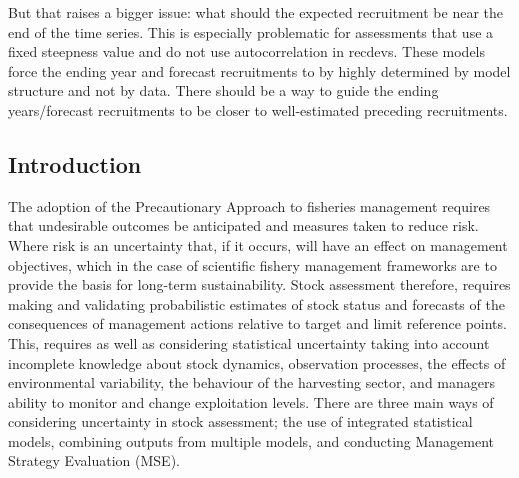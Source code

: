 \documentclass[a4paper]{article}
\begin{document}
But that raises a bigger issue: what should the expected recruitment be near the end of the time series. This is especially problematic for assessments that use a fixed steepness value and do not use autocorrelation in recdevs.  These models force the ending year and forecast recruitments to by highly determined by model structure and not by data.  There should be a way to guide the ending years/forecast recruitments to be closer to well-estimated preceding recruitments.



\begin{abstract}


\end{abstract}

\newpage
\subsection*{Introduction}

The adoption of the Precautionary Approach to fisheries management \citep[PA,][]{garcia1996precautionary} requires that undesirable outcomes be anticipated and measures taken to reduce risk. Where risk is an uncertainty that, if it occurs, will have an effect on management objectives, which in the case of scientific fishery management frameworks are to provide the basis for long-term sustainability. Stock assessment therefore, requires making and validating probabilistic estimates of stock status and forecasts of the consequences of management actions relative to target and limit reference points. This, requires as well as considering statistical uncertainty taking into account incomplete knowledge about stock dynamics, observation processes, the effects of environmental variability, the behaviour of the harvesting sector, and managers ability to monitor and change exploitation levels. There are three main ways of considering uncertainty in stock assessment; the use of integrated statistical models, combining outputs from multiple models, and conducting Management Strategy Evaluation (MSE).
\end{document}
